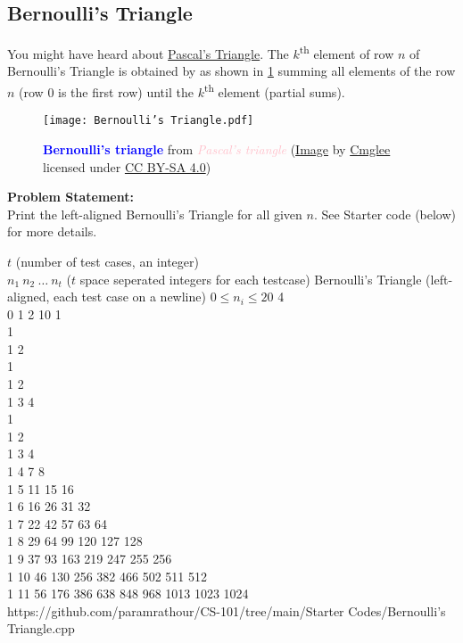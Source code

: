 \subsection{Bernoulli's Triangle}{\label{pp:bernoullistriangle}}
You might have heard about \href{https://youtu.be/0iMtlus-afo}{Pascal's Triangle}. 
The $k$\textsuperscript{th} element of row $n$ of Bernoulli's Triangle is obtained by as shown in \ref{fig:bernoullistriangle} summing all elements of the row $n$ (row $0$ is the first row) until the $k$\textsuperscript{th} element (partial sums).
\begin{figure}[H]
	\centering
	\texttt{[image: Bernoulli's Triangle.pdf]}
	\caption{\textbf{\textcolor{blue}{Bernoulli's triangle}} from \textit{\textcolor{pink}{Pascal's triangle}} (\href{https://bit.ly/bernoullis-triangle}{Image} by \href{https://commons.wikimedia.org/wiki/User:Cmglee}{Cmglee} licensed under \href{https://creativecommons.org/licenses/by-sa/4.0/}{CC BY-SA 4.0})}
	\label{fig:bernoullistriangle}
\end{figure}
\vspace{-1.5em}
\textbf{Problem Statement:}\\
Print the left-aligned Bernoulli's Triangle for all given $n$. See Starter code (below) for more details.
\begin{testcases}
	{$t$ \hfill(number of test cases, an integer)\\$n_1\ n_2\ \ldots\ n_t$ \hfill($t$ space seperated integers for each testcase)}
	{Bernoulli's Triangle \hfill(left-aligned, each test case on a newline)}
	{$0 \leq n_i \leq 20$}
	{4\\0 1 2 10}
	{1\\[1em]1\\1 2\\[1em]1\\1 2\\1 3 4\\[1em]1\\1 2\\1 3 4\\1 4 7 8\\1 5 11 15 16\\1 6 16 26 31 32\\1 7 22 42 57 63 64\\1 8 29 64 99 120 127 128\\1 9 37 93 163 219 247 255 256\\1 10 46 130 256 382 466 502 511 512\\1 11 56 176 386 638 848 968 1013 1023 1024}
	{https://github.com/paramrathour/CS-101/tree/main/Starter Codes/Bernoulli's Triangle.cpp}
\end{testcases}
